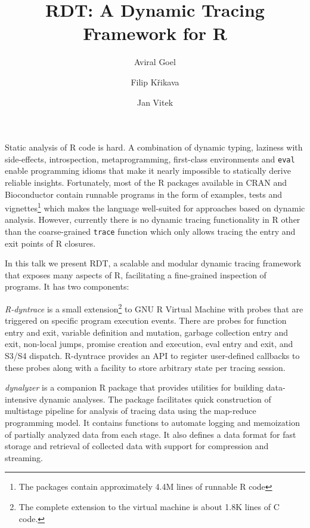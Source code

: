 \documentclass[acmsmall,review]{acmart}
\title{RDT: A Dynamic Tracing Framework for R}
\author{Aviral Goel}
\affiliation{
  \institution{Northeastern University}
  \country{USA}
}
\author{Filip Křikava}
\affiliation{
  \institution{Czech Technical University}
  \country{Czechia}
}
\author{Jan Vitek}
\affiliation{
  \institution{Northeastern University}
  \country{USA}
}
\affiliation{
  \institution{Czech Technical University}
  \country{Czechia}
}
\newcommand{\code}[1]{\lstinline|#1|\xspace}
\newcommand{\RDT}{RDT\xspace}
\newcommand{\RDyntrace}{R-dyntrace\xspace}
\newcommand{\dynalyzer}{dynalyzer\xspace}
\begin{document}
\maketitle

\vspace{-1mm}

Static analysis of R code is hard. A combination of dynamic typing, laziness
with side-effects, introspection, metaprogramming, first-class environments and
\code{eval} enable programming idioms that make it nearly impossible to
statically derive reliable insights. Fortunately, most of the R packages
available in CRAN and Bioconductor contain runnable programs in the form of
examples, tests and vignettes\footnote{The packages contain approximately 4.4M
lines of runnable R code} which makes the language well-suited for approaches
based on dynamic analysis.
%
However, currently there is no dynamic tracing functionality in R other than the
coarse-grained \code{trace} function which only allows tracing the entry and exit
points of R closures.

In this talk we present \RDT, a scalable and modular dynamic tracing framework
that exposes many aspects of R, facilitating a fine-grained inspection of
programs. It has two components:
%
\begin{compactitem}[$-$]
\item \emph{\RDyntrace} is a small extension\footnote{The complete extension to
  the virtual machine is about 1.8K lines of C code.} to GNU R Virtual Machine
  with probes that are triggered on specific program execution events. There are
  probes for function entry and exit, variable definition and
  mutation, garbage collection entry and exit, non-local jumps, promise
  creation and execution, eval entry and exit, and S3/S4 dispatch. \RDyntrace
  provides an API to register user-defined callbacks to these probes along with
  a facility to store arbitrary state per tracing session.
\item \emph{\dynalyzer} is a companion R package that provides utilities for
  building data-intensive dynamic analyses. The package facilitates quick
  construction of multistage pipeline for analysis of tracing data using the
  map-reduce programming model. It contains functions to automate logging and
  memoization of partially analyzed data from each stage. It also defines a
  data format for fast storage and retrieval of collected data with support for
  compression and streaming.
\end{compactitem}
\end{document}
